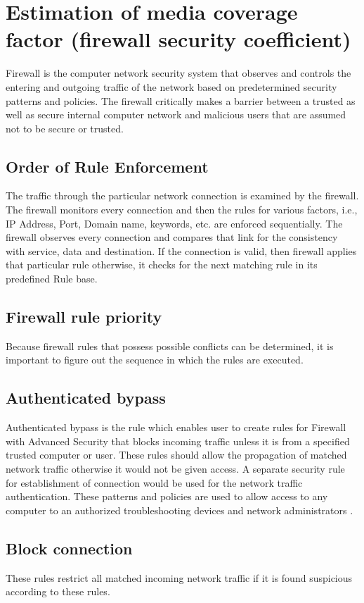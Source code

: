 \section{Estimation of media coverage factor (firewall security coefficient)}
Firewall is the computer network security system that observes and controls
 the entering and outgoing traffic of the network based on predetermined security patterns
  and policies. The firewall critically makes a barrier between a trusted as well as
  secure internal computer network and malicious users that are assumed not
   to be secure or trusted.
\subsection{ Order of Rule Enforcement}
The traffic through the particular network connection is examined by the firewall. The
 firewall monitors every connection and then the rules for various factors,
 i.e., IP Address, Port, Domain name, keywords, etc. are enforced sequentially.
  The firewall observes every connection and compares that link for
  the consistency with service,
data and destination. If the connection is valid, then firewall applies
that particular rule otherwise,
it checks for the next matching rule in its predefined Rule base.
\subsection{Firewall rule priority}
Because firewall rules that possess possible conflicts can be determined, it is important to figure out
 the sequence in which the rules are executed.
\subsection{Authenticated bypass}
Authenticated bypass is the rule which enables user to create rules for Firewall with Advanced Security
that blocks incoming traffic unless it is from a specified trusted computer or user.
These rules should allow the propagation of matched network traffic otherwise it would not be given access. A separate security rule for establishment of connection
would be used for the network traffic authentication. These patterns and policies
are used to allow access to any computer to an authorized troubleshooting devices and
network administrators \cite{edtr15}.
\subsection{Block connection}
These rules restrict all matched incoming network traffic if it is found suspicious according to these rules.
\clearpage
